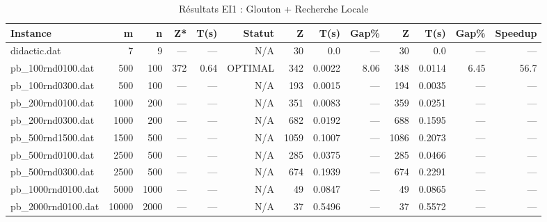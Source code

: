 \begin{table}[htbp]
\centering
\caption{Résultats EI1 : Glouton + Recherche Locale}
\label{tab:ei1}
\footnotesize
\begin{tabular}{|l|rr|rrr|rrr|rrrr|}
\hline
\textbf{Instance} & \textbf{m} & \textbf{n} & \textbf{Z*} & \textbf{T(s)} & \textbf{Statut} & \textbf{Z} & \textbf{T(s)} & \textbf{Gap\%} & \textbf{Z} & \textbf{T(s)} & \textbf{Gap\%} & \textbf{Speedup} \\
\hline
didactic.dat & 7 & 9 & --- & --- & N/A & 30 & 0.0 & --- & 30 & 0.0 & --- & --- \\
pb\_100rnd0100.dat & 500 & 100 & 372 & 0.64 & OPTIMAL & 342 & 0.0022 & 8.06 & 348 & 0.0114 & 6.45 & 56.7 \\
pb\_100rnd0300.dat & 500 & 100 & --- & --- & N/A & 193 & 0.0015 & --- & 194 & 0.0035 & --- & --- \\
pb\_200rnd0100.dat & 1000 & 200 & --- & --- & N/A & 351 & 0.0083 & --- & 359 & 0.0251 & --- & --- \\
pb\_200rnd0300.dat & 1000 & 200 & --- & --- & N/A & 682 & 0.0192 & --- & 688 & 0.1595 & --- & --- \\
pb\_500rnd1500.dat & 1500 & 500 & --- & --- & N/A & 1059 & 0.1007 & --- & 1086 & 0.2073 & --- & --- \\
pb\_500rnd0100.dat & 2500 & 500 & --- & --- & N/A & 285 & 0.0375 & --- & 285 & 0.0466 & --- & --- \\
pb\_500rnd0300.dat & 2500 & 500 & --- & --- & N/A & 674 & 0.1939 & --- & 674 & 0.2291 & --- & --- \\
pb\_1000rnd0100.dat & 5000 & 1000 & --- & --- & N/A & 49 & 0.0847 & --- & 49 & 0.0865 & --- & --- \\
pb\_2000rnd0100.dat & 10000 & 2000 & --- & --- & N/A & 37 & 0.5496 & --- & 37 & 0.5572 & --- & --- \\
\hline
\end{tabular}
\end{table}
